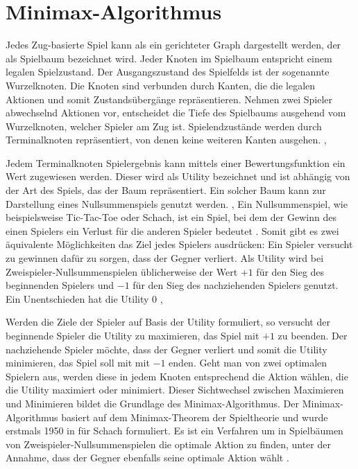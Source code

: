\section{Minimax-Algorithmus}
\label{sec:minimax}
Jedes Zug-basierte Spiel kann als ein gerichteter Graph dargestellt werden, der als Spielbaum bezeichnet wird. 
Jeder Knoten im Spielbaum entspricht einem legalen Spielzustand.
Der Ausgangszustand des Spielfelds ist der sogenannte Wurzelknoten.  
Die Knoten sind verbunden durch Kanten, die die legalen Aktionen und somit Zustandsübergänge repräsentieren. 
Nehmen zwei Spieler abwechselnd Aktionen vor, entscheidet die Tiefe des Spielbaums ausgehend vom Wurzelknoten, welcher Spieler am Zug ist.   
Spielendzustände werden durch Terminalknoten repräsentiert, von denen keine weiteren Kanten ausgehen. \cite[S. 650f.]{millingtonArtificialIntelligenceGames2009}, \cite[S. 123 ff.]{russellArtificialIntelligenceModern2021} 

Jedem Terminalknoten \bzw Spielergebnis kann mittels einer Bewertungsfunktion ein Wert zugewiesen werden. 
Dieser wird als Utility bezeichnet und ist abhängig von der Art des Spiels, das der Baum repräsentiert.
Ein solcher Baum kann zur Darstellung eines Nullsummenspiels genutzt werden. \cite[S. 650f.]{millingtonArtificialIntelligenceGames2009}, \cite[S. 123 ff.]{russellArtificialIntelligenceModern2021} 
Ein Nullsummenspiel, wie beispielsweise Tic-Tac-Toe oder Schach, ist ein Spiel, bei dem der Gewinn des einen Spielers ein Verlust für die anderen Spieler bedeutet \cite[S. 6]{allisSearchingSolutionsGames1994}. Somit gibt es zwei äquivalente Möglichkeiten das Ziel jedes Spielers ausdrücken: Ein Spieler versucht zu gewinnen \bzw dafür zu sorgen, dass der Gegner verliert.
Als Utility wird bei Zweispieler-Nullsummenspielen üblicherweise der Wert $+1$ für den Sieg des beginnenden Spielers und $-1$ für den Sieg des nachziehenden Spielers genutzt.
Ein Unentschieden hat die Utility $0$ \cite[S. 649ff.]{millingtonArtificialIntelligenceGames2009}, \cite[S. 123 ff.]{russellArtificialIntelligenceModern2021}

Werden die Ziele der Spieler auf Basis der Utility formuliert, so versucht der beginnende Spieler die Utility zu maximieren, \dahe das Spiel mit $+1$ zu beenden. Der nachziehende Spieler möchte, dass der Gegner verliert und somit die Utility minimieren, \dahe das Spiel soll mit mit $-1$ enden.
Geht man von zwei optimalen Spielern aus, werden diese in jedem Knoten entsprechend die Aktion wählen, die die Utility maximiert oder minimiert. \cite[S. 124]{russellArtificialIntelligenceModern2021}
Dieser Sichtwechsel zwischen Maximieren und Minimieren bildet die Grundlage des Minimax-Algorithmus. \cite[S. 655]{millingtonArtificialIntelligenceGames2009}
Der Minimax-Algorithmus basiert auf dem Minimax-Theorem der Spieltheorie \cite{v.neumannZurTheorieGesellschaftsspiele1928} und wurde erstmals 1950 in \cite{shannonXXIIProgrammingComputer1950} für Schach formuliert. 
Es ist ein Verfahren um in Spielbäumen von Zweispieler-Nullsummenspielen die optimale Aktion zu finden, unter der Annahme, dass der Gegner ebenfalls seine optimale Aktion wählt \cite[S. 7]{shannonXXIIProgrammingComputer1950}. 

